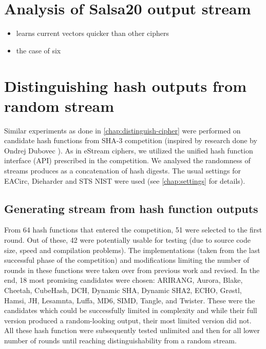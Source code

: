 \documentclass[12pt,oneside]{fithesis2}
\newcommand{\squarebullet}{\textcolor{black}{\raisebox{0.15em}{\rule{4pt}{4pt}}}}
\newenvironment{myItemize}{
  \begin{itemize}[leftmargin=2em,rightmargin=1em,itemsep=\parskip ,parsep=0em,topsep=0em,partopsep=0em]
  \renewcommand{\labelitemi}{\squarebullet}
  \renewcommand{\labelitemii}{$\diamond$}
}{
  \end{itemize}
}
\begin{document}
\chapter{Analysis of Salsa20 output stream}
\label{chap:analysis-salsa}
\begin{myItemize}
\item learns current vectors quicker than other ciphers
\item the case of six
\end{myItemize}

\chapter{Distinguishing hash outputs from random stream}
\label{chap:distinguish-hash}

Similar experiments as done in \autoref{chap:distinguish-cipher} were performed on candidate hash functions from SHA-3 competition
\parencite{sha3-competition}
(inspired by research done by Ondrej Dubovec \parencite{thesis-dubovec}).
As in eStream ciphers, we utilized the unified hash function interface (API) prescribed in the competition.
We analysed the randomness of streams produces as a concatenation of hash digests.
The usual settings for EACirc, Dieharder and STS NIST were used (see \autoref{chap:settings} for details).

\section{Generating stream from hash function outputs}
\label{sec:hash-settings}

From 64 hash functions that entered the competition, 51 were selected to the first round. 
Out of these, 42 were potentially usable for testing (due to source code size, speed and compilation problems).
The implementations (taken from the last successful phase of the competition) and
modifications limiting the number of rounds in these functions were taken over from previous work \parencite{thesis-dubovec}
and revised. In the end, 18 most promising candidates were chosen: ARIRANG, Aurora, Blake, Cheetah, CubeHash, DCH, 
Dynamic SHA, Dynamic SHA2, ECHO, Grøstl, Hamsi, JH, Lesamnta, Luffa, MD6, SIMD, Tangle, and Twister.
These were the candidates which could be successfully limited in complexity and while their full version produced a random-looking
output, their most limited version did not. All these hash function were subsequently tested unlimited and
then for all lower number of rounds until reaching distinguishability from a random stream.
\end{document}
